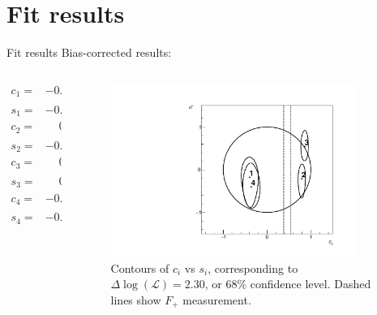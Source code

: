 \documentclass{beamer}
\begin{document}
\section{Fit results}
\begin{frame}{Fit results}
  \vspace{1.0cm}
  Bias-corrected results:
  \vspace{-1.5cm}
  \begin{columns}
    \begin{column}{0.4\textwidth}
      \begin{align*}
        c_1 =& {-0.37} \pm 0.13 \pm 0.01 \\
        s_1 =& {-0.21}_{-0.28}^{+0.45} \pm 0.04 \\
        c_2 =& \phantom{-}0.79 \pm 0.06 \pm 0.01 \\
        s_2 =& {-0.27}_{-0.18}^{+0.37} \pm 0.03 \\
        c_3 =& \phantom{-}0.87 \pm 0.06 \pm 0.01 \\
        s_3 =& \phantom{-}0.58_{-0.45}^{+0.17} \pm 0.06 \\
        c_4 =& {-0.33} \pm 0.13 \pm 0.01 \\
        s_4 =& {-0.48}_{-0.26}^{+0.48} \pm 0.05 \\
      \end{align*}
    \end{column}
    \begin{column}{0.6\textwidth}
      \begin{figure}
        \includegraphics[width=0.9\textwidth]{Plots/Contours_cisi.pdf}
        \caption{Contours of $c_i$ vs $s_i$, corresponding to $\Delta\log(\mathcal{L}) = 2.30$, or $68\%$ confidence level. Dashed lines show $F_+$ measurement.}
      \end{figure}
    \end{column}
  \end{columns}
\end{frame}
\end{document}
